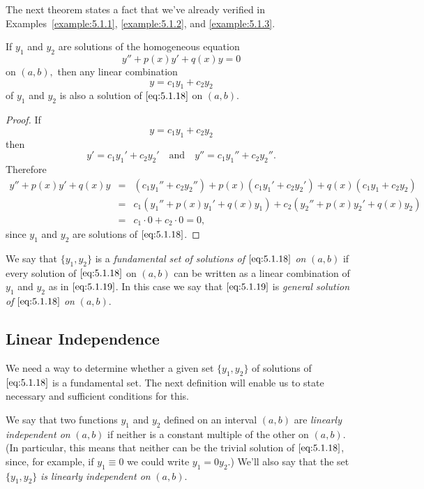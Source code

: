 \documentclass{ximera}
\begin{document}
The next theorem states a fact that we've already verified in
Examples~\ref{example:5.1.1}, \ref{example:5.1.2}, and \ref{example:5.1.3}.
 
\begin{theorem}\label{thmtype:5.1.2}
If $y_1$ and $y_2$ are solutions of the homogeneous equation
\begin{equation}\label{eq:5.1.18}
y''+p(x)y'+q(x)y=0
\end{equation}
on $(a,b),$ then any linear combination
\begin{equation}\label{eq:5.1.19}
y=c_1y_1+c_2y_2
\end{equation}
of $y_1$ and $y_2$ is also a solution of $\eqref{eq:5.1.18}$ on $(a,b).$
\end{theorem}
 
\begin{proof}
 If
$$
y=c_1y_1+c_2y_2
$$
 then
$$
y'=c_1y_1'+c_2y_2'\quad\mbox{and}\quad y''=c_1y_1''+c_2y_2''.
$$
Therefore
\begin{eqnarray*}
y''+p(x)y'+q(x)y&=&(c_1y_1''+c_2y_2'')+p(x)(c_1y_1'+c_2y_2')
+q(x)(c_1y_1+c_2y_2)\\
&=&c_1\left(y_1''+p(x)y_1'+q(x)y_1\right)
+c_2\left(y_2''+p(x)y_2'+q(x)y_2\right)\\
&=&c_1\cdot0+c_2\cdot0=0,
\end{eqnarray*}
since $y_1$ and $y_2$ are solutions of $\eqref{eq:5.1.18}$. 
\end{proof}
We say that  $\{y_1,y_2\}$ is a \textit{fundamental set of
solutions of $\eqref{eq:5.1.18}$ on}  $(a,b)$ if every solution
of $\eqref{eq:5.1.18}$ on  $(a,b)$ can be written as a linear
combination of $y_1$ and $y_2$ as in $\eqref{eq:5.1.19}$.
In this case we say that $\eqref{eq:5.1.19}$ is
\textit{general solution of $\eqref{eq:5.1.18}$ on}  $(a,b)$.
 
\subsection*{Linear Independence}
 
We need a way to determine whether a given set $\{y_1,y_2\}$
of solutions of $\eqref{eq:5.1.18}$  is a fundamental set.
The next definition will enable us to state necessary and
sufficient conditions for this.
 
We say that two functions $y_1$ and $y_2$ defined on an interval
$(a,b)$ are \textit{linearly independent on} $(a,b)$ if neither is a
constant multiple of the other on $(a,b)$. (In
particular, this means
that neither can be the trivial solution of $\eqref{eq:5.1.18}$, since, for
example, if $y_1\equiv0$  we could write $y_1=0y_2$.) We'll also
say that the set $\{y_1,y_2\}$ \textit{is linearly independent on}
$(a,b)$.
 
\end{document}
